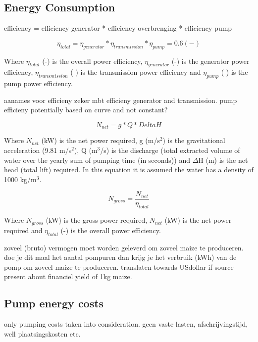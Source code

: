 \subsection{Energy Consumption}
efficiency = efficiency generator * efficiency overbrenging * efficiency pump

\begin{equation}
 \eta_{total} =   \eta_{generator} * \eta_{transmission} * \eta_{pump} = 0.6 (-)
\end{equation}

Where $\eta_{total}$ (-) is the overall power efficiency, $\eta_{generator}$ (-) is the generator power efficiency, $\eta_{transmission}$ (-) is the transmission power efficiency and $\eta_{pump}$ (-) is the pump power efficiency. 

aanames voor efficieny zeker mbt efficieny generator and transmission. pump efficieny potentially based on curve and not constant?

\begin{equation}
N_{net} =  g * Q * DeltaH
\end{equation}

Where $N_{net}$ (kW) is the net power required, g (m/s$^2$) is the gravitational acceleration (9.81 m/s$^2$), Q (m$^3$/s) is the discharge (total extracted volume of water over the yearly sum of pumping time (in seconds)) and $\Delta$H (m) is the net head (total lift) required. In this equation it is assumed the water has a density of 1000 kg/m$^3$.
  
\begin{equation}
 N_{gross} =   \frac{N_{net}}{\eta_{total}}
\end{equation}

Where $N_{gross}$ (kW) is the gross power required, $N_{net}$ (kW) is the net power required and $\eta_{total}$ (-) is the overall power efficiency. 

zoveel (bruto) vermogen moet worden geleverd om zoveel maize te produceren.
doe je dit maal het aantal pompuren dan krijg je het verbruik (kWh) van de pomp om zoveel maize te produceren. 
translaten towards USdollar if source present about financiel yield of 1kg maize. 
 

\subsection{Pump energy costs}
only pumping costs taken into consideration. geen vaste lasten, afschrijvingstijd, well plaatsingskosten etc. 

